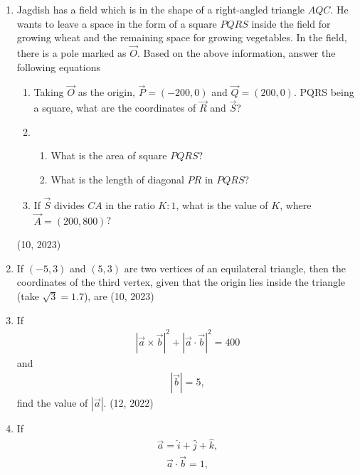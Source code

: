 \begin{enumerate}[label=\thesubsection.\arabic*,ref=\thesubsection.\theenumi]
    \item Jagdish has a field which is in the shape of a right-angled triangle $ AQC $. He wants to leave a space in the form of a square $ PQRS $ inside the field for growing wheat and the remaining space for growing vegetables.  In the field, there is a pole marked as $ \vec{O} $.
    Based on the above information, answer the following equations
    \begin{enumerate}
        \item Taking $ \vec{O} $ as the origin, $ \vec{P} = (-200,0) $ and  $ \vec{Q} = (200,0) $. PQRS being a square, what are the coordinates of $ \vec{R} $ and $ \vec{S} $?
        \item
        \begin{enumerate}
            \item What is the area of square $ PQRS $?
            \item What is the length of diagonal $ PR $ in $ PQRS $?
        \end{enumerate}
        \item If $ \vec{S} $ divides $ CA $ in the ratio $ K:1 $, what is the value of $ K $, where $ \vec{A} = (200,800) $?
    \end{enumerate}
    \hfill (10, 2023)
    \item If $(-5,3)$ and $(5,3)$ are two vertices of an equilateral triangle, then the coordinates of the third vertex, given that the origin lies inside the triangle (take $\sqrt{3} = 1.7$), are
    \hfill (10, 2023)
    \item If
    \begin{align*}
        \left| \overrightarrow{a} \times \overrightarrow{b} \right|^2 + \left| \overrightarrow{a} \cdot \overrightarrow{b} \right|^2 = 400
    \end{align*}
    and
    \begin{align*}
        \left| \overrightarrow{b} \right| = 5,
    \end{align*}
    find the value of $\left| \overrightarrow{a} \right|$.
    \hfill (12, 2022)
    \item If
    \begin{align*}
        \overrightarrow{a} = \hat{i} + \hat{j} + \hat{k},
    \end{align*}
    \begin{align*}
        \overrightarrow{a} \cdot \overrightarrow{b} = 1,
    \end{align*}

\end{enumerate}
